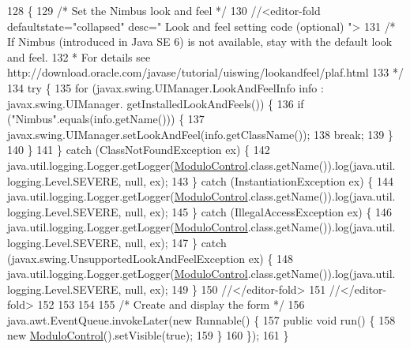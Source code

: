 \begin{DoxyCode}
128                                            \{
129         \textcolor{comment}{/* Set the Nimbus look and feel */}
130         \textcolor{comment}{//<editor-fold defaultstate="collapsed" desc=" Look and feel setting code (optional) ">}
131         \textcolor{comment}{/* If Nimbus (introduced in Java SE 6) is not available, stay with the default look and feel.}
132 \textcolor{comment}{         * For details see http://download.oracle.com/javase/tutorial/uiswing/lookandfeel/plaf.html }
133 \textcolor{comment}{         */}
134         \textcolor{keywordflow}{try} \{
135             \textcolor{keywordflow}{for} (javax.swing.UIManager.LookAndFeelInfo info : javax.swing.UIManager.
      getInstalledLookAndFeels()) \{
136                 \textcolor{keywordflow}{if} (\textcolor{stringliteral}{"Nimbus"}.equals(info.getName())) \{
137                     javax.swing.UIManager.setLookAndFeel(info.getClassName());
138                     \textcolor{keywordflow}{break};
139                 \}
140             \}
141         \} \textcolor{keywordflow}{catch} (ClassNotFoundException ex) \{
142             java.util.logging.Logger.getLogger(\mbox{\hyperlink{class_sockets_1_1_modulo_control}{ModuloControl}}.class.getName()).log(java.util.
      logging.Level.SEVERE, null, ex);
143         \} \textcolor{keywordflow}{catch} (InstantiationException ex) \{
144             java.util.logging.Logger.getLogger(\mbox{\hyperlink{class_sockets_1_1_modulo_control}{ModuloControl}}.class.getName()).log(java.util.
      logging.Level.SEVERE, null, ex);
145         \} \textcolor{keywordflow}{catch} (IllegalAccessException ex) \{
146             java.util.logging.Logger.getLogger(\mbox{\hyperlink{class_sockets_1_1_modulo_control}{ModuloControl}}.class.getName()).log(java.util.
      logging.Level.SEVERE, null, ex);
147         \} \textcolor{keywordflow}{catch} (javax.swing.UnsupportedLookAndFeelException ex) \{
148             java.util.logging.Logger.getLogger(\mbox{\hyperlink{class_sockets_1_1_modulo_control}{ModuloControl}}.class.getName()).log(java.util.
      logging.Level.SEVERE, null, ex);
149         \}
150         \textcolor{comment}{//</editor-fold>}
151         \textcolor{comment}{//</editor-fold>}
152         
153         
154         
155         \textcolor{comment}{/* Create and display the form */}
156         java.awt.EventQueue.invokeLater(\textcolor{keyword}{new} Runnable() \{
157             \textcolor{keyword}{public} \textcolor{keywordtype}{void} run() \{
158                 \textcolor{keyword}{new} \mbox{\hyperlink{class_r_m_i_1_1_modulo_control_a59c204b1a6186d387912952c321b34be}{ModuloControl}}().setVisible(\textcolor{keyword}{true});
159             \}
160         \});
161     \}
\end{DoxyCode}


